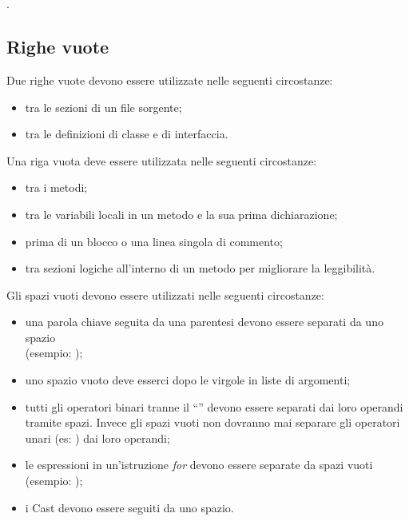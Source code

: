 \begin{itemize}
  \hspace*{0.5cm} \\ 
  \hspace*{1.5cm} \\ 
  \hspace*{0.5cm} \\ 
  \hspace*{1.5cm} \\
  \hspace*{0.5cm} \\ 
  \hspace*{1.5cm} \\
  \hspace*{0.5cm} \co{\}}\\ .
\end{itemize}

\subsection{Righe vuote}
Due righe vuote devono essere utilizzate nelle seguenti circostanze:
\begin{itemize}
  \item tra le sezioni di un file sorgente; 
  \item tra le definizioni di classe e di interfaccia.  
\end{itemize} 
Una riga vuota deve essere utilizzata nelle seguenti circostanze:
\begin{itemize}
  \item tra i metodi; 
  \item tra le variabili locali in un metodo e la sua prima dichiarazione;
  \item prima di un blocco o una linea singola di commento;
  \item tra sezioni logiche all'interno di un metodo per migliorare la
  leggibilit\`a.
\end{itemize}
Gli spazi vuoti devono essere utilizzati nelle seguenti circostanze:
\begin{itemize}
  \item una parola chiave seguita da una parentesi devono essere separati da uno
  spazio \\(esempio: );
  \item uno spazio vuoto deve esserci dopo le virgole in liste di
  argomenti;
  \item tutti gli operatori binari tranne il ``'' devono essere separati
  dai loro operandi tramite spazi. Invece gli spazi vuoti non dovranno mai
  separare gli operatori unari (es: \co{++}) dai loro operandi;
  \item le espressioni in un'istruzione \emph{for} devono essere separate da
  spazi vuoti \\(esempio: );
  \item i Cast devono essere seguiti da uno spazio.
\end{itemize} 

